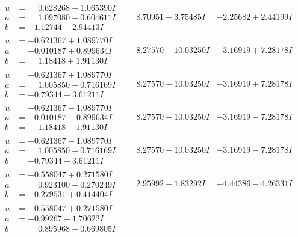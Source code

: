 \documentclass[1p]{elsarticle_modified}
\theoremstyle{definition}
\begin{document}
$$\begin{array}{c|c|c}
\begin{aligned}
u &= \phantom{-}0.628268 - 1.065390 I \\
a &= \phantom{-}1.097080 - 0.604611 I \\
b &= -1.12744 - 2.94413 I\end{aligned}
 & \phantom{-}8.70951 - 3.75485 I & -2.25682 + 2.44199 I \\ \hline\begin{aligned}
u &= -0.621367 + 1.089770 I \\
a &= -0.010187 + 0.899634 I \\
b &= \phantom{-}1.18418 + 1.91130 I\end{aligned}
 & \phantom{-}8.27570 - 10.03250 I & -3.16919 + 7.28178 I \\ \hline\begin{aligned}
u &= -0.621367 + 1.089770 I \\
a &= \phantom{-}1.005850 - 0.716169 I \\
b &= -0.79344 - 3.61211 I\end{aligned}
 & \phantom{-}8.27570 - 10.03250 I & -3.16919 + 7.28178 I \\ \hline\begin{aligned}
u &= -0.621367 - 1.089770 I \\
a &= -0.010187 - 0.899634 I \\
b &= \phantom{-}1.18418 - 1.91130 I\end{aligned}
 & \phantom{-}8.27570 + 10.03250 I & -3.16919 - 7.28178 I \\ \hline\begin{aligned}
u &= -0.621367 - 1.089770 I \\
a &= \phantom{-}1.005850 + 0.716169 I \\
b &= -0.79344 + 3.61211 I\end{aligned}
 & \phantom{-}8.27570 + 10.03250 I & -3.16919 - 7.28178 I \\ \hline\begin{aligned}
u &= -0.558047 + 0.271580 I \\
a &= \phantom{-}0.923100 - 0.270249 I \\
b &= -0.279531 + 0.414404 I\end{aligned}
 & \phantom{-}2.95992 + 1.83292 I & -4.44386 - 4.26331 I \\ \hline\begin{aligned}
u &= -0.558047 + 0.271580 I \\
a &= -0.99267 + 1.70622 I \\
b &= \phantom{-}0.895968 + 0.669805 I\end{aligned}

\end{array}$$
\end{document}

